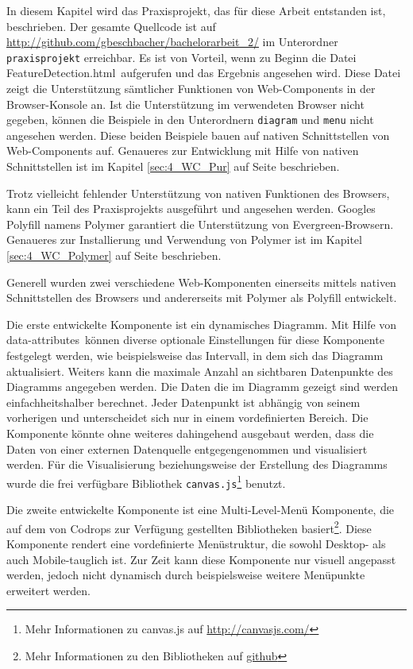 In diesem Kapitel wird das Praxisprojekt, das für diese Arbeit entstanden ist, beschrieben. Der gesamte Quellcode ist auf \url{http://github.com/gbeschbacher/bachelorarbeit_2/} im Unterordner \lstinline|praxisprojekt| erreichbar. Es ist von Vorteil, wenn zu Beginn die Datei \glqq FeatureDetection.html\grqq\ aufgerufen und das Ergebnis angesehen wird. Diese Datei zeigt die Unterstützung sämtlicher Funktionen von Web-Components in der Browser-Konsole an. Ist die Unterstützung im verwendeten Browser nicht gegeben, können die Beispiele in den Unterordnern \lstinline|diagram| und \lstinline|menu| nicht angesehen werden. Diese beiden Beispiele bauen auf nativen Schnittstellen von Web-Components auf. Genaueres zur Entwicklung mit Hilfe von nativen Schnittstellen ist im Kapitel \ref{sec:4_WC_Pur} auf Seite \pageref{sec:4_WC_Pur} beschrieben.

Trotz vielleicht fehlender Unterstützung von nativen Funktionen des Browsers, kann ein Teil des Praxisprojekts ausgeführt und angesehen werden. Googles Polyfill namens Polymer garantiert die Unterstützung von \glqq Evergreen\grqq -Browsern. Genaueres zur Installierung und Verwendung von Polymer ist im Kapitel \ref{sec:4_WC_Polymer} auf Seite \pageref{sec:4_WC_Polymer} beschrieben.

Generell wurden zwei verschiedene Web-Komponenten einerseits mittels nativen Schnittstellen des Browsers und andererseits mit Polymer als Polyfill entwickelt.

Die erste entwickelte Komponente ist ein dynamisches Diagramm. Mit Hilfe von \glqq data-attributes\grqq\ können diverse optionale Einstellungen für diese Komponente festgelegt werden, wie beispielsweise das Intervall, in dem sich das Diagramm aktualisiert. Weiters kann die maximale Anzahl an sichtbaren Datenpunkte des Diagramms angegeben werden. Die Daten die im Diagramm gezeigt sind werden einfachheitshalber berechnet. Jeder Datenpunkt ist abhängig von seinem vorherigen und unterscheidet sich nur in einem vordefinierten Bereich. Die Komponente könnte ohne weiteres dahingehend ausgebaut werden, dass die Daten von einer externen Datenquelle entgegengenommen und visualisiert werden. Für die Visualisierung beziehungsweise der Erstellung des Diagramms wurde die frei verfügbare Bibliothek \lstinline|canvas.js|\footnote{Mehr Informationen zu canvas.js auf \href{http://canvasjs.com/}{http://canvasjs.com/}} benutzt.

Die zweite entwickelte Komponente ist eine \glqq Multi-Level\grqq -Menü Komponente, die auf dem von Codrops zur Verfügung gestellten Bibliotheken basiert\footnote{Mehr Informationen zu den Bibliotheken auf \href{https://github.com/codrops/MultiLevelPushMenu}{github}}. Diese Komponente rendert eine vordefinierte Menüstruktur, die sowohl Desktop- als auch Mobile-tauglich ist. Zur Zeit kann diese Komponente nur visuell angepasst werden, jedoch nicht dynamisch durch beispielsweise weitere Menüpunkte erweitert werden.

